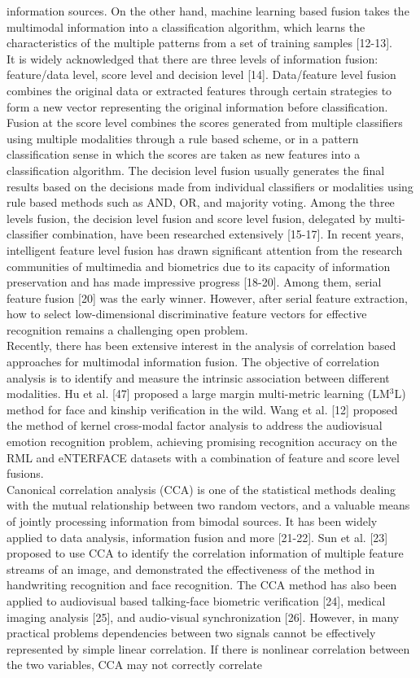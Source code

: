 \documentclass[journal]{IEEEtran}
\begin{document}
information sources. On the other hand, machine learning based fusion takes the multimodal information into a classification algorithm, which learns the characteristics of the multiple patterns from a set of training samples [12-13].\\\indent It is widely acknowledged that there are three levels of information fusion: feature/data level, score level and decision level [14]. Data/feature level fusion combines the original data or extracted features through certain strategies to form a new vector representing the original information before classification. Fusion at the score level combines the scores generated from multiple classifiers using multiple modalities through a rule based scheme, or in a pattern classification sense in which the scores are taken as new features into a classification algorithm. The decision level fusion usually generates the final results based on the decisions made from individual classifiers or modalities using rule based methods such as AND, OR, and majority voting. Among the three levels fusion, the decision level fusion and score level fusion, delegated by multi-classifier combination, have been researched extensively [15-17]. In recent years, intelligent feature level fusion has drawn significant attention from the research communities of multimedia and biometrics due to its capacity of information preservation and has made impressive progress [18-20]. Among them, serial feature fusion [20] was the early winner. However, after serial feature extraction, how to select low-dimensional discriminative feature vectors for effective recognition remains a challenging open problem. \\\indent Recently, there has been extensive interest in the analysis of correlation based approaches for multimodal information fusion. The objective of correlation analysis is to identify and measure the intrinsic association between different modalities. Hu et al. [47] proposed a large margin multi-metric learning (LM$^3$L) method for face and kinship verification in the wild. Wang et al. [12] proposed the method of kernel cross-modal factor analysis to address the audiovisual emotion recognition problem, achieving promising recognition accuracy on the RML and eNTERFACE datasets with a combination of feature and score level fusions. \\\indent Canonical correlation analysis (CCA) is one of the statistical methods dealing with the mutual relationship between two random vectors, and a valuable means of jointly processing information from bimodal sources. It has been widely applied to data analysis, information fusion and more [21-22]. Sun et al. [23] proposed to use CCA to identify the correlation information of multiple feature streams of an image, and demonstrated the effectiveness of the method in handwriting recognition and face recognition. The CCA method has also been applied to audiovisual based talking-face biometric verification [24], medical imaging analysis [25], and audio-visual synchronization [26]. However, in many practical problems dependencies between two signals cannot be effectively represented by simple linear correlation. If there is nonlinear correlation between the two variables, CCA may not correctly correlate 
\end{document}
